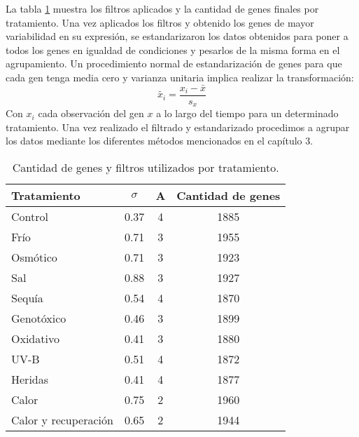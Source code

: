 La tabla \ref{tabla:genes_por_tratamiento} muestra los filtros aplicados y la cantidad de genes finales por tratamiento.
Una vez aplicados los filtros y obtenido los genes de mayor variabilidad en su expresión, se estandarizaron los datos obtenidos para poner a todos los genes en igualdad de condiciones y pesarlos de la misma forma en el agrupamiento. Un procedimiento normal de estandarización de genes para que cada gen tenga media cero y varianza unitaria implica realizar la transformación:
\begin{equation}
	\tilde{x_i} = \frac{x_i-\bar{x}}{s_x}
\end{equation}
Con $x_i$ cada observación del gen $x$ a lo largo del tiempo para un determinado tratamiento. Una vez realizado el filtrado y estandarizado procedimos a agrupar los datos mediante los diferentes métodos mencionados en el capítulo 3.
\begin{table}[t]
  \centering
\begin{tabular}{| l | c | c | c |}
\hline
Tratamiento & $\sigma$ & A & Cantidad de genes \\
\hline
Control & 0.37 & 4 & 1885 \\
\hline
Frío & 0.71 & 3 & 1955 \\
\hline
Osmótico & 0.71 & 3 & 1923 \\
\hline
Sal & 0.88 & 3 & 1927 \\
\hline
Sequía & 0.54 & 4 & 1870 \\
\hline
Genotóxico & 0.46 & 3 & 1899 \\
\hline
Oxidativo & 0.41 & 3 & 1880 \\
\hline
UV-B & 0.51 & 4 & 1872 \\
\hline
Heridas & 0.41 & 4 & 1877 \\
\hline
Calor & 0.75 & 2 & 1960 \\
\hline
Calor y recuperación & 0.65 & 2 & 1944 \\
\hline                                         
\end{tabular}
\caption{Cantidad de genes y filtros utilizados por tratamiento.}
\label{tabla:genes_por_tratamiento}
\end{table}
